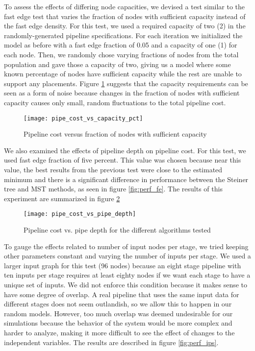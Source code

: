 \documentclass{acmart}
\begin{document}
	To assess the effects of differing node capacities, we devised a test similar to the fast edge test that varies the fraction of nodes with sufficient capacity instead of the fast edge density. For this test, we used a required capacity of two (2) in the randomly-generated pipeline specifications. For each iteration we initialized the model as before with a fast edge fraction of 0.05 and a capacity of one (1) for each node. Then, we randomly chose varying fractions of nodes from the total population and gave those a capacity of two, giving us a model where some known percentage of nodes have sufficient capacity while the rest are unable to support any placements. Figure \ref{fig:perf_cap} suggests that the capacity requirements can be seen as a form of noise because changes in the fraction of nodes with sufficient capacity causes only small, random fluctuations to the total pipeline cost.
	
	\begin{figure}[H]
	    \centering
	    \texttt{[image: pipe\_cost\_vs\_capacity\_pct]}
	    \caption{Pipeline cost versus fraction of nodes with sufficient capacity}
	    \label{fig:perf_cap}
	\end{figure}
	
	We also examined the effects of pipeline depth on pipeline cost. For this test, we used fast edge fraction of five percent. This value was chosen because near this value, the best results from the previous test were close to the estimated minimum and there is a significant difference in performance between the Steiner tree and MST methods, as seen in figure \ref{fig:perf_fe}. The results of this experiment are summarized in figure \ref{fig:perf_depth}
	
	\begin{figure}[H]
	    \centering
	    \texttt{[image: pipe\_cost\_vs\_pipe\_depth]}
	    \caption{Pipeline cost vs. pipe depth for the different algorithms tested}
	    \label{fig:perf_depth}
	\end{figure}
	 
	 To gauge the effects related to number of input nodes per stage, we tried keeping other parameters constant and varying the number of inputs per stage. We used a larger input graph for this test (96 nodes) because an eight stage pipeline with ten inputs per stage requires at least eighty nodes if we want each stage to have a unique set of inputs. We did not enforce this condition because it makes sense to have some degree of overlap. A real pipeline that uses the same input data for different stages does not seem outlandish, so we allow this to happen in our random models. However, too much overlap was deemed undesirable for our simulations because the behavior of the system would be more complex and harder to analyze, making it more difficult to see the effect of changes to the independent variables. The results are described in figure \ref{fig:perf_ips}.
	 
\end{document}
